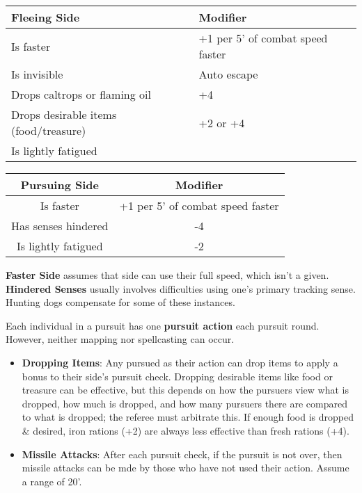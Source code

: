 \documentclass{article}
\begin{document}
\begin{multicols}{2}
\begin{longtable}[]{@{}
  >{\centering\arraybackslash}p{}
  >{\centering\arraybackslash}p{}@{}}
\toprule\noalign{}
\begin{minipage}[b]{\linewidth}\centering
Fleeing Side
\end{minipage} & \begin{minipage}[b]{\linewidth}\centering
Modifier
\end{minipage} \\
\midrule\noalign{}
\endhead
\bottomrule\noalign{}
\endlastfoot
Is faster & +1 per 5' of combat speed faster \\
Is invisible & Auto escape \\
Drops caltrops or flaming oil & +4 \\
Drops desirable items (food/treasure) & +2 or +4 \\
Is lightly fatigued & -2 \\
\end{longtable}

\begin{longtable}[]{@{}cc@{}}
\toprule\noalign{}
Pursuing Side & Modifier \\
\midrule\noalign{}
\endhead
\bottomrule\noalign{}
\endlastfoot
Is faster & +1 per 5' of combat speed faster \\
Has senses hindered & -4 \\
Is lightly fatigued & -2 \\
\end{longtable}

\textbf{Faster Side} assumes that side can use their full speed, which
isn't a given. \textbf{Hindered Senses} usually involves difficulties
using one's primary tracking sense. Hunting dogs compensate for some of
these instances.

Each individual in a pursuit has one \textbf{pursuit action} each
pursuit round. However, neither mapping nor spellcasting can occur.

\begin{itemize}
\tightlist
\item
  \textbf{Dropping Items}: Any pursued as their action can drop items to
  apply a bonus to their side's pursuit check. Dropping desirable items
  like food or treasure can be effective, but this depends on how the
  pursuers view what is dropped, how much is dropped, and how many
  pursuers there are compared to what is dropped; the referee must
  arbitrate this. If enough food is dropped \& desired, iron rations
  (+2) are always less effective than fresh rations (+4).
\item
  \textbf{Missile Attacks}: After each pursuit check, if the pursuit is
  not over, then missile attacks can be mde by those who have not used
  their action. Assume a range of 20'.
\end{itemize}


\end{multicols}
\end{document}

